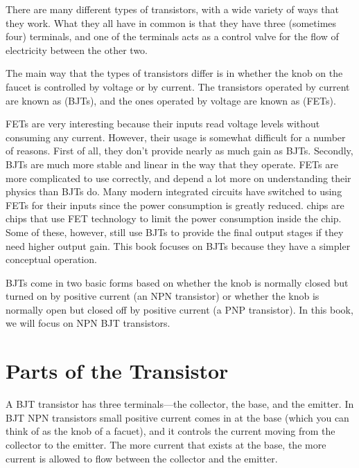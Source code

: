 There are many different types of transistors, with a wide variety of ways that they work.
What they all have in common is that they have three (sometimes four) terminals, and one of the terminals acts as a control valve for the flow of electricity between the other two.

The main way that the types of transistors differ is in whether the knob on the faucet is controlled by voltage or by current.
The transistors operated by current are known as  (BJTs), and the ones operated by voltage are known as  (FETs).

FETs are very interesting because their inputs read voltage levels without consuming any current.
However, their usage is somewhat difficult for a number of reasons.
First of all, they don't provide nearly as much gain as BJTs.
Secondly, BJTs are much more stable and linear in the way that they operate.
FETs are more complicated to use correctly, and depend a lot more on understanding their physics than BJTs do.
Many modern integrated circuits have switched to using FETs for their inputs since the power consumption is greatly reduced.
 chips are chips that use FET technology to limit the power consumption inside the chip.
Some of these, however, still use BJTs to provide the final output stages if they need higher output gain.
This book focuses on BJTs because they have a simpler conceptual operation.

BJTs come in two basic forms based on whether the knob is normally closed but turned on by positive current (an NPN transistor) or whether the knob is normally open but closed off by positive current (a PNP transistor).
In this book, we will focus on NPN BJT transistors. %

\section{Parts of the Transistor}


A BJT transistor has three terminals---the collector, the base, and the emitter.
In BJT NPN transistors small positive current comes in at the base (which you can think of as the knob of a facuet), and it controls the current moving from the collector to the emitter.
The more current that exists at the base, the more current is allowed to flow between the collector and the emitter.

